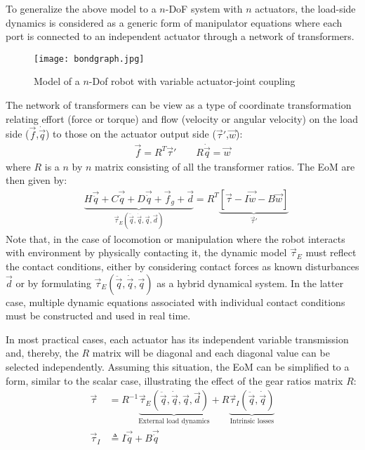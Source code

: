 To generalize the above model to a $n$-DoF system with $n$ actuators, the load-side dynamics is considered as a generic form of manipulator equations where each port is connected to an independent actuator through a network of transformers. 
%
\begin{figure}[htp]
	\centering
		\texttt{[image: bondgraph.jpg]}
	\vspace{-10pt}
	\caption{Model of a $n$-Dof robot with variable actuator-joint coupling}
	\label{fig:bondgraph}
\end{figure}
%
The network of transformers can be view as a type of coordinate transformation relating effort (force or torque) and flow (velocity or angular velocity) on the load side ($\vec{f}$,$\dot{\vec{q}}$) to those on the actuator output side ($\vec{\tau}'$,$\vec{w}$):
%
\begin{align}
	\vec{ f } = R^T \vec{\tau}' \quad  \quad R \dot{ \vec{q} } = \vec{w}
 \label{eq:coortransform}
\end{align}
%
where $R$ is a $n$ by $n$ matrix consisting of all the transformer ratios. The EoM are then given by:
%
\begin{align}
	&\underbrace{ H \vec{ \ddot{q} } + C\vec{ \dot{q} } + D \vec{ \dot{q} } + \vec{ f }_g  + \vec{ d }}_{ \vec{\tau}_{E}(\ddot{\vec{q}},\dot{\vec{q}},\vec{q},\vec{d})}
		= R^T \underbrace{  \left[ 
		\vec{ \tau } - I \vec{ \dot{w} } - B \vec{ w }       
		\right]}_{ \vec{\tau}' } 
 \label{eq:eom_ndof}
\end{align}
%
Note that, in the case of locomotion or manipulation where the robot interacts with environment by physically contacting it, the dynamic model $\vec{\tau}_{E}$ must reflect the contact conditions, either by considering contact forces as known disturbances $\vec{ d }$ or by formulating $\vec{\tau}_{E}(\ddot{\vec{q}},\dot{\vec{q}},\vec{q})$ as a hybrid dynamical system. In the latter case, multiple dynamic equations associated with individual contact conditions must be constructed and used in real time.

In most practical cases, each actuator has its independent variable transmission and, thereby, the $R$ matrix will be diagonal and each diagonal value can be selected independently. Assuming this situation, the EoM can be simplified to a form, similar to the scalar case, illustrating the effect of the gear ratios matrix $R$: 
%
\begin{align}
	\vec{\tau} &= R^{-1} 
	\underbrace{ 
	\vec{\tau}_{E}(\ddot{\vec{q}},\dot{\vec{q}},\vec{q},\vec{d}) 
	}_{\text{External load dynamics}}
	+ R 
	\underbrace{ 
	\vec{\tau}_{I}(\ddot{\vec{q}},\dot{\vec{q}})
		}_{\text{Intrinsic losses}}
	\\ %
	\vec{\tau}_{I} &\triangleq I \vec{ \ddot{q} } + B \vec{ \dot{q} } 
 \label{eq:eom_ndof2}
\end{align}
%
